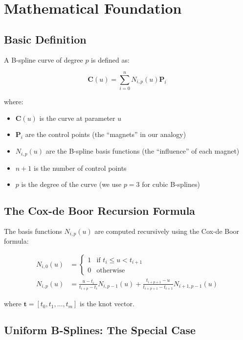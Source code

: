 \documentclass[12pt,a4paper]{article}
\begin{document}
\section{Mathematical Foundation}

\subsection{Basic Definition}

A B-spline curve of degree $p$ is defined as:

\begin{equation}
    \mathbf{C}(u) = \sum_{i=0}^{n} N_{i,p}(u) \mathbf{P}_i
\end{equation}

where:
\begin{itemize}
    \item $\mathbf{C}(u)$ is the curve at parameter $u$
    \item $\mathbf{P}_i$ are the control points (the ``magnets'' in our analogy)
    \item $N_{i,p}(u)$ are the B-spline basis functions (the ``influence'' of each magnet)
    \item $n+1$ is the number of control points
    \item $p$ is the degree of the curve (we use $p=3$ for cubic B-splines)
\end{itemize}

\subsection{The Cox-de Boor Recursion Formula}

The basis functions $N_{i,p}(u)$ are computed recursively using the Cox-de Boor formula:

\begin{align}
    N_{i,0}(u) &= \begin{cases}
        1 & \text{if } t_i \leq u < t_{i+1} \\
        0 & \text{otherwise}
    \end{cases} \\[10pt]
    N_{i,p}(u) &= \frac{u - t_i}{t_{i+p} - t_i} N_{i,p-1}(u) + \frac{t_{i+p+1} - u}{t_{i+p+1} - t_{i+1}} N_{i+1,p-1}(u)
\end{align}

where $\mathbf{t} = [t_0, t_1, ..., t_m]$ is the knot vector.

\subsection{Uniform B-Splines: The Special Case}
\end{document}
